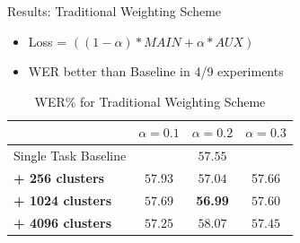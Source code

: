 \documentclass[final]{beamer} %
\begin{document}
\begin{frame}
\begin{columns}
\begin{column}{0.3\textwidth}
{        \vfill
        
        \begin{block}{\boxnumber Results: Traditional Weighting Scheme}
          \begin{itemize}
          \item Loss = $((1-\alpha)*MAIN + \alpha*AUX)$
          \item WER better than Baseline in 4/9 experiments
          \end{itemize}
        \end{block}

        
        \vfill
        

                  
          \begin{table}[!htbp]
            \centering
            \caption{WER\% for Traditional Weighting Scheme}
            \begin{adjustbox}{width=\textwidth}
              \begin{tabular}{lccc}
                \toprule
                & $\alpha = 0.1 $ & $\alpha = 0.2 $ & $\alpha = 0.3 $\\
                \midrule
                Single Task Baseline  &  \multicolumn{3}{c}{$57.55$ \raisebox{.33\height}{\footnotesize{$\pm 1.82$}}}     \\
                
                \textbf{+ 256 clusters}  &  $57.93$ \raisebox{.33\height}{\footnotesize{$\pm 1.63$}}   &  $57.04$ \raisebox{.33\height}{\footnotesize{$\pm 1.58$}}     & 57.66 \raisebox{.33\height}{\footnotesize{$\pm 1.24$}} \\
                
                \textbf{+ 1024 clusters}   & $57.69$ \raisebox{.33\height}{\footnotesize{$\pm 3.78$}}    & \textbf{56.99} \raisebox{.33\height}{\footnotesize{$\pm 3.08$}}    & $57.60$ \raisebox{.33\height}{\footnotesize{$\pm 0.79$}}  \\
                
                \textbf{+ 4096 clusters}   &  $57.25$ \raisebox{.33\height}{\footnotesize{$\pm 2.87$}}  & $58.07$ \raisebox{.33\height}{\footnotesize{$\pm 1.35$}}   &   $57.45$ \raisebox{.33\height}{\footnotesize{$\pm 0.32$}}  \\
                \bottomrule
              \end{tabular}
            \end{adjustbox}
          \end{table}


}
\end{column}
\end{columns}
\end{frame}
\end{document}
